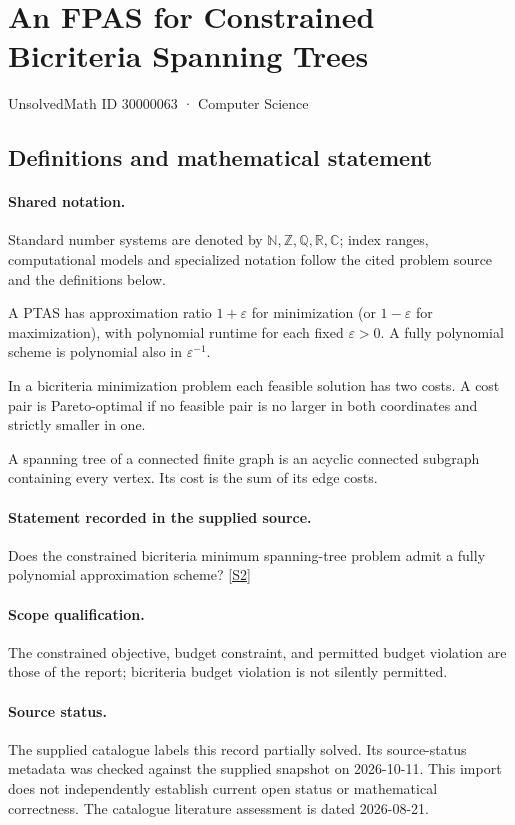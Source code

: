 \documentclass[11pt]{article}
\newcommand{\sref}[2]{\hyperlink{source:#1:#2}{[S#2]}}
\begin{document}
\setcounter{section}{30000062}
\section{An FPAS for Constrained Bicriteria Spanning Trees}\label{30000063}
{\small\sffamily UnsolvedMath ID 30000063 · Computer Science}
\subsection{Definitions and mathematical statement}

\paragraph{Shared notation.}Standard number systems are denoted by $\mathbb N,\mathbb Z,\mathbb Q,\mathbb R,\mathbb C$; index ranges, computational models and specialized notation follow the cited problem source and the definitions below.


A PTAS has approximation ratio $1+\varepsilon$ for minimization (or $1-\varepsilon$ for maximization), with polynomial runtime for each fixed $\varepsilon>0$. A fully polynomial scheme is polynomial also in $\varepsilon^{-1}$.

In a bicriteria minimization problem each feasible solution has two costs. A cost pair is Pareto-optimal if no feasible pair is no larger in both coordinates and strictly smaller in one.

A spanning tree of a connected finite graph is an acyclic connected subgraph containing every vertex. Its cost is the sum of its edge costs.
\paragraph{Statement recorded in the supplied source.}
Does the constrained bicriteria minimum spanning-tree problem admit a fully polynomial approximation scheme? \sref{30000063}{2}
\paragraph{Scope qualification.}
The constrained objective, budget constraint, and permitted budget violation are those of the report; bicriteria budget violation is not silently permitted.
\paragraph{Source status.}
The supplied catalogue labels this record partially solved. Its source-status metadata was checked against the supplied snapshot on 2026-10-11. This import does not independently establish current open status or mathematical correctness. The catalogue literature assessment is dated 2026-08-21.
\end{document}
